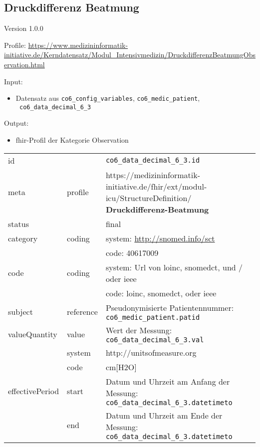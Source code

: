 \subsection{Druckdifferenz Beatmung} 
\noindent Version 1.0.0

\noindent Profile: \url{https://www.medizininformatik-initiative.de/Kerndatensatz/Modul_Intensivmedizin/DruckdifferenzBeatmungObservation.html}

\noindent Input:
\begin{itemize}
	\item Datensatz aus \texttt{co6\_config\_variables}, \texttt{co6\_medic\_patient}, \\ \texttt{
co6\_data\_decimal\_6\_3}
\end{itemize}
Output:
\begin{itemize}
        \item \ac{fhir}-Profil der Kategorie \glqq Observation\grqq{}
\end{itemize}
\begin{longtable}{|l|l|p{7.5cm}|}
        \hline
        \rowcolor{lightgray} \multicolumn{3}{|l|}{Data Mapping (inhaltlich)} \\ \hline
        id &  & \texttt{co6\_data\_decimal\_6\_3.id} \\ \hline
	meta & profile & https://medizininformatik-initiative.de/fhir/ext/modul-icu/StructureDefinition/\textbf{
Druckdifferenz-Beatmung} \\ \hline 
	status &  & final  \\ \hline 
	category & coding & system: \url{http://snomed.info/sct} \\
\cline{3-3}
	& & code: 40617009 \\ \hline
	code & coding & system: Url von \ac{loinc}, \ac{snomedct}, und / oder \ac{ieee} \\ 
	\cline{3-3} 
	 &  & code: \ac{loinc}, \ac{snomedct}, oder \ac{ieee} \\ \hline
	subject & reference & Pseudonymisierte Patientennummer: \texttt{co6\_medic\_patient.patid} \\ \hline
	valueQuantity & value & Wert der Messung: \texttt{
co6\_data\_decimal\_6\_3.val} \\
        \cline{2-3}
         & system & http://unitsofmeasure.org \\
         \cline{2-3}
         & code &
cm[H2O]
\\ \hline
    effectivePeriod & start & Datum und Uhrzeit am Anfang der Messung: \texttt{
co6\_data\_decimal\_6\_3.datetimeto} \\
    \cline{2-3}
     & end & Datum und Uhrzeit am Ende der Messung: \texttt{
co6\_data\_decimal\_6\_3.datetimeto} \\ \hline
\end{longtable}


